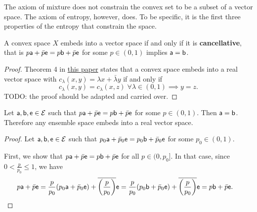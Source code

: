 The axiom of mixture does not constrain the convex set to be a subset of a vector space. The axiom of entropy, however, does. To be specific, it is the first three properties of the entropy that constrain the space.

\begin{mathSection}
\begin{prop}
	A convex space $X$ embeds into a vector space if and only if it is \textbf{cancellative}, that is $p \ens[a] + \bar{p} \ens = p \ens[b] + \bar{p} \ens$ for some $p \in (0,1)$ implies $\ens[a] = \ens[b]$.
\end{prop}

\begin{proof}
	Theorem 4 in \href{https://arxiv.org/abs/1105.1270}{this paper} states that a convex space embeds into a real vector space with $c_\lambda(x,y) = \lambda x + \bar{\lambda}y$ if and only if
	$$ c_\lambda(x,y) = c_\lambda(x,z) \; \forall \lambda \in (0,1) \implies y = z.$$ TODO: the proof should be adapted and carried over.
\end{proof}

\begin{thrm}
	Let $\ens[a], \ens[b], \ens \in \Ens$ such that $p\ens[a] + \bar{p} \ens = p \ens[b] + \bar{p} \ens$ for some $p \in (0,1)$. Then $\ens[a] = \ens[b]$. Therefore any ensemble space embeds into a real vector space.
\end{thrm}

\begin{proof}
	Let $\ens[a], \ens[b], \ens \in \Ens$ such that $p_0\ens[a] + \bar{p}_0 \ens = p_0 \ens[b] + \bar{p}_0 \ens$ for some $p_0 \in (0,1)$.
	
	First, we show that $p\ens[a] + \bar{p} \ens = p \ens[b] + \bar{p} \ens$ for all $p \in (0,p_0]$. In that case, since $0 < \frac{p}{p_0} \leq 1$, we have
	\begin{equation}
		\begin{aligned}
			p \ens[a] + \bar{p} \ens &= \frac{p}{p_0} (p_0 \ens[a] + \bar{p}_0 \ens) + \overline{\left(\frac{p}{p_0}\right)} \ens = \frac{p}{p_0} (p_0 \ens[b] + \bar{p}_0 \ens) + \overline{\left(\frac{p}{p_0}\right)} \ens = p \ens[b] + \bar{p} \ens.
		\end{aligned}
	\end{equation}
	

\end{proof}
\end{mathSection}
